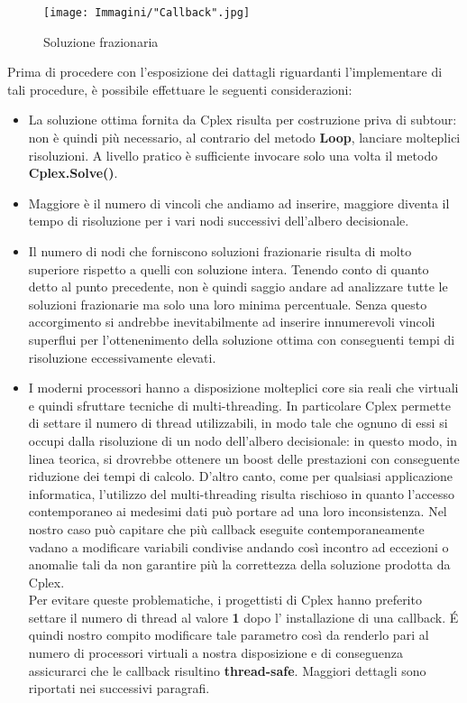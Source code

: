 \documentclass[11pt]{article}
\begin{document}
\begin{figure}[htbp]
    \centering
    \texttt{[image: Immagini/"Callback".jpg]}
    \caption{Soluzione frazionaria}
\end{figure}

Prima di procedere con l'esposizione dei dattagli riguardanti l'implementare di tali procedure, è possibile effettuare le seguenti considerazioni:\\

\begin{itemize}
    \item La soluzione ottima fornita da Cplex risulta per costruzione priva di subtour: non è quindi più necessario, al contrario del metodo \textbf{Loop}, lanciare molteplici risoluzioni. A livello pratico è sufficiente invocare solo una volta il metodo \textbf{Cplex.Solve()}.
    \item Maggiore è il numero di vincoli che andiamo ad inserire, maggiore diventa il tempo di risoluzione per i vari nodi successivi dell'albero decisionale.
    \item Il numero di nodi che forniscono soluzioni frazionarie risulta di molto superiore rispetto a quelli con soluzione intera. Tenendo conto di quanto detto al punto precedente, non è quindi saggio andare ad analizzare tutte le soluzioni frazionarie ma solo una loro minima percentuale. Senza questo accorgimento si andrebbe inevitabilmente ad inserire innumerevoli vincoli superflui per l'ottenenimento della soluzione ottima con conseguenti tempi di risoluzione eccessivamente elevati.
    \item I moderni processori hanno a disposizione molteplici core sia reali che virtuali e quindi sfruttare tecniche di multi-threading. In particolare Cplex permette di settare il numero di thread utilizzabili, in modo tale che ognuno di essi si occupi dalla risoluzione di un nodo dell'albero decisionale: in questo modo, in linea teorica, si drovrebbe ottenere un boost delle prestazioni con conseguente riduzione dei tempi di calcolo. D'altro canto, come per qualsiasi applicazione informatica, l'utilizzo del multi-threading risulta rischioso in quanto l'accesso contemporaneo ai medesimi dati può portare ad una loro inconsistenza. Nel nostro caso può capitare che più callback eseguite contemporaneamente vadano a modificare variabili condivise andando così incontro ad eccezioni o anomalie tali da non garantire più la correttezza della soluzione prodotta da Cplex.\\
    Per evitare queste problematiche, i progettisti di Cplex hanno preferito settare il numero di thread al valore \textbf{1} dopo l' installazione di una callback. \'E quindi nostro compito modificare tale parametro così da renderlo pari al numero di processori virtuali a nostra disposizione e di conseguenza assicurarci che le callback risultino \textbf{thread-safe}. Maggiori dettagli sono riportati nei successivi paragrafi.
\end{itemize}
\end{document}
